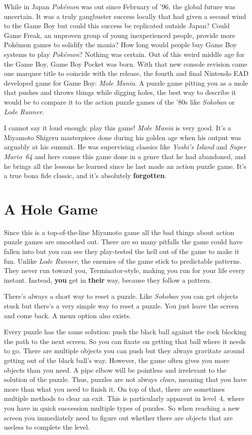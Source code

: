 \documentclass{book}
\begin{document}
While in Japan \emph{Pokémon} was out since February of ’96, the global future was uncertain. It was a truly gangbuster success locally that had given a second wind to the Game Boy but could this success be replicated outside Japan? Could Game Freak, an unproven group of young inexperienced people, provide more Pokémon games to solidify the mania? How long would people buy Game Boy systems to play \emph{Pokémon}? Nothing was certain. Out of this weird middle age for the Game Boy, Game Boy Pocket was born. With that new console revision came one marquee title to coincide with the release, the fourth and final Nintendo EAD developed game for Game Boy: \emph{Mole Mania}. A puzzle game pitting you as a mole that pushes and throws things while digging holes, the best way to describe it would be to compare it to the action puzzle games of the ’80s like \emph{Sokoban} or \emph{Lode Runner}.

I cannot say it loud enough: play this game! \emph{Mole Mania} is very good. It’s a Miyamoto Shigeru masterpiece done during his golden age when his output was arguably at his summit. He was supervising classics like \emph{Yoshi’s Island} and \emph{Super Mario 64} and here comes this game done in a genre that he had abandoned, and he brings all the lessons he learned since he last made an action puzzle game. It’s a true bona fide classic, and it’s absolutely \textbf{forgotten}.

\FloatBarrier\needspace{5pt}\section*{A Hole Game}\nopagebreak[4]
Since this is a top-of-the-line Miyamoto game all the bad things about action puzzle games are smoothed out. There are so many pitfalls the game could have fallen into but you can see they play-tested the hell out of the game to make it fun. Unlike \emph{Lode Runner}, the enemies of the game stick to predictable patterns. They never run toward you, Terminator-style, making you run for your life every instant. Instead, \textbf{you} get in \textbf{their} way, because they follow a pattern.

There’s always a short way to reset a puzzle. Like \emph{Sokoban} you can get objects stuck but there’s a very simple way to reset a puzzle. You just leave the screen and come back. A menu option also exists.

Every puzzle has the same solution: push the black ball against the rock blocking the path to the next screen. So you can fixate on getting that ball where it needs to go. There are multiple objects you can push but they always gravitate around getting out of the black ball’s way. However, the game often gives you more objects than you need. A pipe elbow will be pointless and irrelevant to the solution of the puzzle. Thus, puzzles are not always \emph{clean}, meaning that you have more than what you need to finish it. On top of that, there are sometimes multiple methods to clear an exit. This is particularly apparent in level 4, where you have in quick succession multiple types of puzzles. So when reaching a new screen you immediately need to figure out whether there are objects that are useless to complete the level.
\end{document}
